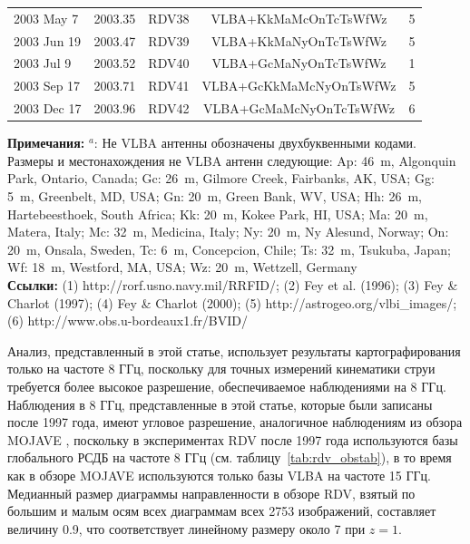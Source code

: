 \begin{table}[tbh!]
\begin{SingleSpace}
\begin{tabular}{lcccc}
2003 May 7  & 2003.35 & RDV38  & VLBA+KkMaMcOnTcTsWfWz     & 5   \\
2003 Jun 19 & 2003.47 & RDV39  & VLBA+KkMaNyOnTcTsWfWz     & 5   \\
2003 Jul 9  & 2003.52 & RDV40  & VLBA+GcMaNyOnTcTsWfWz     & 1   \\
2003 Sep 17 & 2003.71 & RDV41  & VLBA+GcKkMaMcNyOnTsWfWz   & 5   \\
2003 Dec 17 & 2003.96 & RDV42  & VLBA+GcMaMcNyOnTcTsWfWz   & 6   \\
\bottomrule
\end{tabular}
\end{SingleSpace}
\textbf{Примечания:}
$^a$: Не VLBA антенны обозначены двухбуквенными кодами.
Размеры и местонахождения не VLBA антенн следующие:
Ap: 46~m, Algonquin Park, Ontario, Canada;
Gc: 26~m, Gilmore Creek, Fairbanks, AK, USA;
Gg: 5~m, Greenbelt, MD, USA;
Gn: 20~m, Green Bank, WV, USA;
Hh: 26~m, Hartebeesthoek, South Africa;
Kk: 20~m, Kokee Park, HI, USA;
Ma: 20~m, Matera, Italy;
Mc: 32~m, Medicina, Italy;
Ny: 20~m, Ny Alesund, Norway;
On: 20~m, Onsala, Sweden,
Tc: 6~m, Concepcion, Chile;
Ts: 32~m, Tsukuba, Japan;
Wf: 18~m, Westford, MA, USA;
Wz: 20~m, Wettzell, Germany\\
\textbf{Ссылки:}
(1) http://rorf.usno.navy.mil/RRFID/;
(2) Fey et al. (1996);
(3) Fey \& Charlot (1997);
(4) Fey \& Charlot (2000);
(5) http://astrogeo.org/vlbi\_images/;
(6) http://www.obs.u-bordeaux1.fr/BVID/ \\
\end{table}

Анализ, представленный в этой статье, использует результаты картографирования только на частоте 8
ГГц, поскольку для точных измерений кинематики струи требуется более высокое разрешение,
обеспечиваемое наблюдениями на 8 ГГц. Наблюдения в 8 ГГц, представленные в этой статье, которые были
записаны после 1997 года, имеют угловое разрешение, аналогичное наблюдениям из обзора MOJAVE
\cite{Lister_2009a}, поскольку в экспериментах RDV после 1997 года используются базы глобального
РСДБ на частоте 8 ГГц (см. таблицу~\ref{tab:rdv_obstab}), в то время как в обзоре MOJAVE
используются только базы VLBA на частоте 15 ГГц. Медианный размер диаграммы направленности в обзоре
RDV, взятый по большим и малым осям всех диаграммам всех 2753 изображений, составляет величину
\SI{0.9}{\mas}, что соответствует линейному размеру около \SI{7}{\parsec} при $z = 1$.

